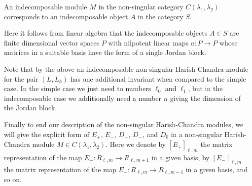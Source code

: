 \begin{corollary}
  An indecomposable module $M$ in the non-singular category $C(\lambda_1,\lambda_2)$ corresponds to an indecomposable object $A$ in the category $S$.
\end{corollary}

Here it follows from linear algebra that the indecomposable objects $A\in S$ are finite dimensional vector spaces $P$ with nilpotent linear maps $a\colon P\to P$ whose matrices in a suitable basis have the form of a single Jordan block.

\begin{remark}
  Note that by the above an indecomposable non-singular Harish-Chandra module for the pair $(L,L_k)$ has one additional invariant when compared to the simple case. In the simple case we just need to numbers $\ell_0$ and $\ell_1$, but in the indecomposable case we additionally need a number $n$ giving the dimension of the Jordan block.
\end{remark}

Finally to end our description of the non-singular Harish-Chandra modules, we will give the explicit form of $E_+$, $E_-$, $D_+$, $D_-$, and $D_0$ in a non-singular Harish-Chandra module $M\in C(\lambda_1,\lambda_2)$. Here we denote by $[E_+]_{\ell,m}$ the matrix representation of the map $E_+\colon R_{\ell,m}\to R_{\ell,m+1}$ in a given basis, by $[E_-]_{\ell,m}$ the matrix representation of the map $E_-\colon R_{\ell,m}\to R_{\ell,m-1}$ in a given basis, and so on.

